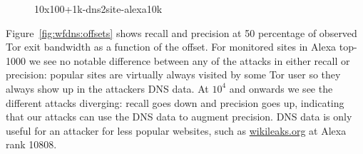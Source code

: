 \begin{figure}[t]
\centering
{}
\caption{10x100+1k-dns2site-alexa10k}
\label{fig:wfdns:torpct}
\end{figure}


Figure~\ref{fig:wfdns:offsets} shows recall and precision at 50 percentage of
observed Tor exit bandwidth as a function of the offset. For monitored sites in
Alexa top-1000 we see no notable difference between any of the attacks in either
recall or precision: popular sites are virtually always visited by some Tor user
so they always show up in the attackers DNS data. At $10^4$ and onwards we see
the different attacks diverging: recall goes down and precision goes up,
indicating that our attacks can use the DNS data to augment precision.
DNS data is only useful for an attacker for less popular websites, such as
\url{wikileaks.org} at Alexa rank 10808.


